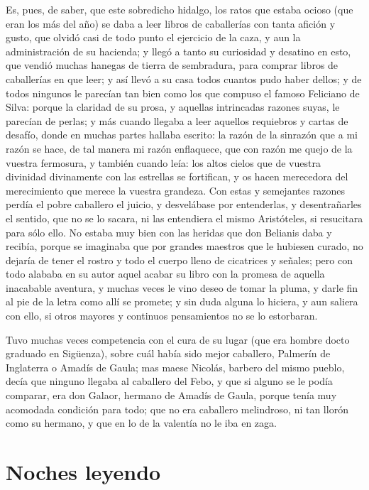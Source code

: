 Es, pues, de saber, que este sobredicho hidalgo, los ratos que estaba
ocioso (que eran los más del año) se daba a leer libros de caballerías
con tanta afición y gusto, que olvidó casi de todo punto el ejercicio
de la caza, y aun la administración de su hacienda; y llegó a tanto su
curiosidad y desatino en esto, que vendió muchas hanegas de tierra de
sembradura, para comprar libros de caballerías en que leer; y así
llevó a su casa todos cuantos pudo haber dellos; y de todos ningunos
le parecían tan bien como los que compuso el famoso Feliciano de
Silva: porque la claridad de su prosa, y aquellas intrincadas razones
suyas, le parecían de perlas; y más cuando llegaba a leer aquellos
requiebros y cartas de desafío, donde en muchas partes hallaba
escrito: la razón de la sinrazón que a mi razón se hace, de tal manera
mi razón enflaquece, que con razón me quejo de la vuestra fermosura, y
también cuando leía: los altos cielos que de vuestra divinidad
divinamente con las estrellas se fortifican, y os hacen merecedora del
merecimiento que merece la vuestra grandeza. Con estas y semejantes
razones perdía el pobre caballero el juicio, y desvelábase por
entenderlas, y desentrañarles el sentido, que no se lo sacara, ni las
entendiera el mismo Aristóteles, si resucitara para sólo ello. No
estaba muy bien con las heridas que don Belianis daba y recibía,
porque se imaginaba que por grandes maestros que le hubiesen curado,
no dejaría de tener el rostro y todo el cuerpo lleno de cicatrices y
señales; pero con todo alababa en su autor aquel acabar su libro con
la promesa de aquella inacabable aventura, y muchas veces le vino
deseo de tomar la pluma, y darle fin al pie de la letra como allí se
promete; y sin duda alguna lo hiciera, y aun saliera con ello, si
otros mayores y continuos pensamientos no se lo estorbaran.

Tuvo muchas veces competencia con el cura de su lugar (que era hombre
docto graduado en Sigüenza), sobre cuál había sido mejor caballero,
Palmerín de Inglaterra o Amadís de Gaula; mas maese Nicolás, barbero
del mismo pueblo, decía que ninguno llegaba al caballero del Febo, y
que si alguno se le podía comparar, era don Galaor, hermano de Amadís
de Gaula, porque tenía muy acomodada condición para todo; que no era
caballero melindroso, ni tan llorón como su hermano, y que en lo de la
valentía no le iba en zaga.

\section{Noches leyendo}

